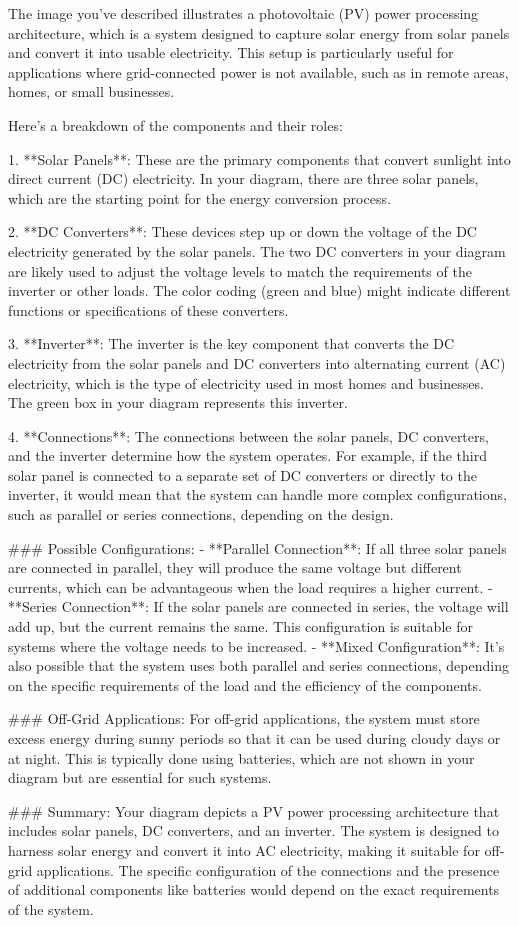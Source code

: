 The image you've described illustrates a photovoltaic (PV) power processing architecture, which is a system designed to capture solar energy from solar panels and convert it into usable electricity. This setup is particularly useful for applications where grid-connected power is not available, such as in remote areas, homes, or small businesses.

Here's a breakdown of the components and their roles:

1. **Solar Panels**: These are the primary components that convert sunlight into direct current (DC) electricity. In your diagram, there are three solar panels, which are the starting point for the energy conversion process.

2. **DC Converters**: These devices step up or down the voltage of the DC electricity generated by the solar panels. The two DC converters in your diagram are likely used to adjust the voltage levels to match the requirements of the inverter or other loads. The color coding (green and blue) might indicate different functions or specifications of these converters.

3. **Inverter**: The inverter is the key component that converts the DC electricity from the solar panels and DC converters into alternating current (AC) electricity, which is the type of electricity used in most homes and businesses. The green box in your diagram represents this inverter.

4. **Connections**: The connections between the solar panels, DC converters, and the inverter determine how the system operates. For example, if the third solar panel is connected to a separate set of DC converters or directly to the inverter, it would mean that the system can handle more complex configurations, such as parallel or series connections, depending on the design.

### Possible Configurations:
- **Parallel Connection**: If all three solar panels are connected in parallel, they will produce the same voltage but different currents, which can be advantageous when the load requires a higher current.
- **Series Connection**: If the solar panels are connected in series, the voltage will add up, but the current remains the same. This configuration is suitable for systems where the voltage needs to be increased.
- **Mixed Configuration**: It’s also possible that the system uses both parallel and series connections, depending on the specific requirements of the load and the efficiency of the components.

### Off-Grid Applications:
For off-grid applications, the system must store excess energy during sunny periods so that it can be used during cloudy days or at night. This is typically done using batteries, which are not shown in your diagram but are essential for such systems.

### Summary:
Your diagram depicts a PV power processing architecture that includes solar panels, DC converters, and an inverter. The system is designed to harness solar energy and convert it into AC electricity, making it suitable for off-grid applications. The specific configuration of the connections and the presence of additional components like batteries would depend on the exact requirements of the system.